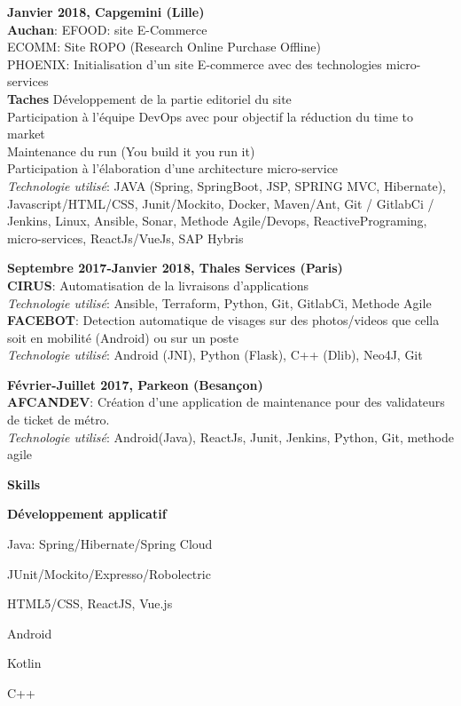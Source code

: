 \documentclass[a4paper,11pt,final]{memoir}
\newcommand\tab[1][1,8cm]{\hspace*{#1}}
\newcommand{\CVSection}[1]
	{\Large\textbf{#1}\par
	\normalsize\normalfont}
\newcommand{\CVItem}[1]
	{\textbf{\color{RoyalBlue} #1}}
\begin{document}
\CVItem{Janvier 2018, Capgemini (Lille) }\\
\textbf{Auchan}: EFOOD: site E-Commerce\\
\tab ECOMM: Site ROPO (Research Online Purchase Offline)\\
\tab PHOENIX:  Initialisation d'un site E-commerce avec des technologies micro-services\\
\textbf{Taches  }   \textbullet  Développement de la partie editoriel du site \\
\tab \textbullet  Participation à l'équipe DevOps avec pour objectif la réduction du time to market \\
\tab \textbullet Maintenance du run (You build it you run it) \\
\tab \textbullet Participation à l'élaboration d'une architecture micro-service  \\
 \textit{Technologie utilisé}: JAVA (Spring, SpringBoot, JSP, SPRING MVC, Hibernate), Javascript/HTML/CSS, Junit/Mockito, Docker, Maven/Ant, Git / GitlabCi / Jenkins, Linux, Ansible, Sonar, Methode Agile/Devops, ReactivePrograming, micro-services, ReactJs/VueJs, SAP Hybris

\CVItem{Septembre 2017-Janvier 2018, Thales Services (Paris) }\\
\textbf{CIRUS}: Automatisation de la livraisons d'applications\\
 \textit{Technologie utilisé}: Ansible, Terraform, Python, Git, GitlabCi, Methode Agile \\
 \textbf{FACEBOT}: Detection automatique de visages sur des photos/videos que cella soit en mobilité (Android) ou sur un poste \\
 \textit{Technologie utilisé}: Android (JNI), Python (Flask), C++ (Dlib), Neo4J, Git 


\CVItem{Février-Juillet 2017, Parkeon (Besançon)}\\
\textbf{AFCANDEV}: Création d’une application de maintenance pour des validateurs de ticket de métro. \\
 \textit{Technologie utilisé}: Android(Java), ReactJs, Junit, Jenkins, Python, Git, methode agile


\CVSection{Skills}
\CVItem{Développement applicatif}
\begin{multicols}{2}
\begin{compactitem}[\color{RoyalBlue}$\circ$]
	\item Java: Spring/Hibernate/Spring Cloud
	\item  JUnit/Mockito/Expresso/Robolectric
	\item  HTML5/CSS,  ReactJS, Vue.js
	\item Android
	 \item Kotlin 
	\item C++
\end{compactitem}
\end{multicols}
\end{document}
